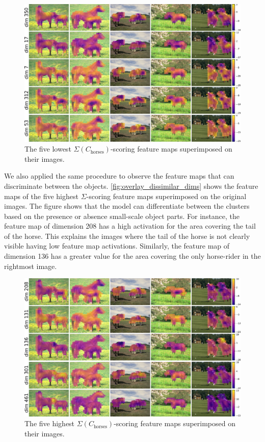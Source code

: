 \begin{figure}[!t]
    \centering
    \includegraphics[width=.9\textwidth]{figures/overlayed_dim_similar.pdf}
    \caption{The five lowest $\Sigma(C_{\text{horses}})$-scoring feature maps superimposed on their images.}
    \label{fig:overlay_similar_dims}
\end{figure}

We also applied the same procedure to observe the feature maps that can discriminate between the objects. \autoref{fig:overlay_dissimilar_dims} shows the feature maps of the five highest $\Sigma$-scoring feature maps superimposed on the original images. The figure shows that the model can differentiate between the clusters based on the presence or absence small-scale object parts. For instance, the feature map of dimension 208 has a high activation for the area covering the tail of the horse. This explains the images where the tail of the horse is not clearly visible having low feature map activations. Similarly, the feature map of dimension 136 has a greater value for the area covering the only horse-rider in the rightmost image.

\begin{figure}[!t]
    \centering
    \includegraphics[width=.9\textwidth]{figures/overlayed_dim_dissimilar.pdf}
    \caption{The five highest $\Sigma(C_{\text{horses}})$-scoring feature maps superimposed on their images.}
    \label{fig:overlay_dissimilar_dims}
\end{figure}

